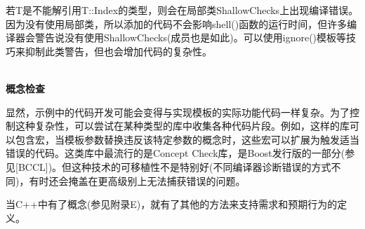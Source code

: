 若T是不能解引用T::Index的类型，则会在局部类ShallowChecks上出现编译错误。因为没有使用局部类，所以添加的代码不会影响shell()函数的运行时间，但许多编译器会警告说没有使用ShallowChecks(成员也是如此)。可以使用ignore()模板等技巧来抑制此类警告，但也会增加代码的复杂性。

\hspace*{\fill} \\ %
\noindent
\textbf{概念检查}

显然，示例中的代码开发可能会变得与实现模板的实际功能代码一样复杂。为了控制这种复杂性，可以尝试在某种类型的库中收集各种代码片段。例如，这样的库可以包含宏，当模板参数替换违反该特定参数的概念时，这些宏可以扩展为触发适当错误的代码。这类库中最流行的是Concept Check库，是Boost发行版的一部分(参见[BCCL])。但这种技术的可移植性不是特别好(不同编译器诊断错误的方式不同)，有时还会掩盖在更高级别上无法捕获错误的问题。

当C++中有了概念(参见附录E)，就有了其他的方法来支持需求和预期行为的定义。






























